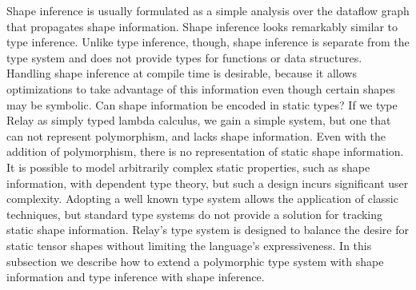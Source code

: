 Shape inference is usually formulated as a simple analysis over the dataflow graph that
  propagates shape information.
Shape inference looks remarkably similar to type inference.
Unlike type inference, though, shape inference is separate from the type system and
  does not provide types for functions or data structures.
Handling shape inference at compile time is desirable, because it allows optimizations to take
  advantage of this information even though certain shapes may be symbolic. Can shape information be encoded in static types?
If we type Relay as simply typed lambda calculus,
  we gain a simple system, but one that can not represent polymorphism,
  and lacks shape information.
Even with the addition of polymorphism, there is no representation of static
  shape information.
It is possible to model arbitrarily complex static properties, such
  as shape information, with dependent type theory, but such
  a design incurs significant user complexity.
Adopting a well known type system allows the application of
  classic techniques, but standard type systems do not
  provide a solution for tracking static shape information.
Relay's type system is designed to balance the desire for static tensor shapes
  without limiting the language's expressiveness.
In this subsection we describe how to extend a polymorphic type system with shape
  information and type inference with shape inference.

